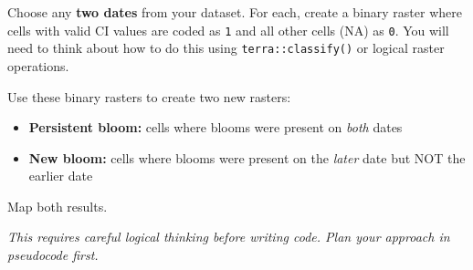 \documentclass[
]{article}
\providecommand{\tightlist}{%
  \setlength{\itemsep}{0pt}\setlength{\parskip}{0pt}}
\begin{document}
Choose any \textbf{two dates} from your dataset. For each, create a
binary raster where cells with valid CI values are coded as \texttt{1}
and all other cells (NA) as \texttt{0}. You will need to think about how
to do this using \texttt{terra::classify()} or logical raster
operations.

Use these binary rasters to create two new rasters:

\begin{itemize}
\tightlist
\item
  \textbf{Persistent bloom:} cells where blooms were present on
  \emph{both} dates
\item
  \textbf{New bloom:} cells where blooms were present on the
  \emph{later} date but NOT the earlier date
\end{itemize}

Map both results.

\emph{This requires careful logical thinking before writing code. Plan
your approach in pseudocode first.}
\end{document}
